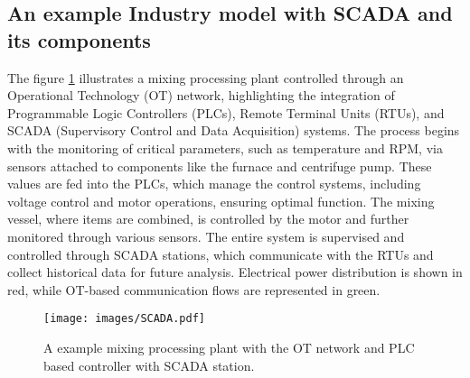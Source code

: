 \subsection{An example Industry model with SCADA and its components}
The figure \ref{fig:scada} illustrates a mixing processing plant controlled through an Operational Technology (OT) network, highlighting the integration of Programmable Logic Controllers (PLCs), Remote Terminal Units (RTUs), and SCADA (Supervisory Control and Data Acquisition) systems. The process begins with the monitoring of critical parameters, such as temperature and RPM, via sensors attached to components like the furnace and centrifuge pump. These values are fed into the PLCs, which manage the control systems, including voltage control and motor operations, ensuring optimal function. The mixing vessel, where items are combined, is controlled by the motor and further monitored through various sensors. The entire system is supervised and controlled through SCADA stations, which communicate with the RTUs and collect historical data for future analysis. Electrical power distribution is shown in red, while OT-based communication flows are represented in green. 
\begin{figure}[ht!]
    \centering
   \texttt{[image: images/SCADA.pdf]}

    \caption{A example mixing processing plant with the OT network and PLC based controller with SCADA station. }
    \label{fig:scada}
\end{figure}